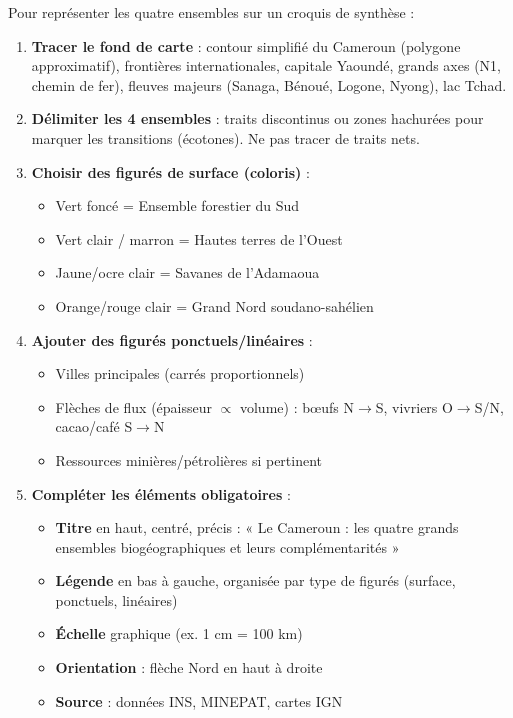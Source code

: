 \documentclass[11pt]{article}
\begin{document}
\begin{methode}
Pour représenter les quatre ensembles sur un croquis de synthèse :
\begin{enumerate}
    \item \textbf{Tracer le fond de carte} : contour simplifié du Cameroun (polygone approximatif), frontières internationales, capitale Yaoundé, grands axes (N1, chemin de fer), fleuves majeurs (Sanaga, Bénoué, Logone, Nyong), lac Tchad.
    \item \textbf{Délimiter les 4 ensembles} : traits discontinus ou zones hachurées pour marquer les transitions (écotones). Ne pas tracer de traits nets.
    \item \textbf{Choisir des figurés de surface (coloris)} : 
    \begin{itemize}
        \item Vert foncé = Ensemble forestier du Sud
        \item Vert clair / marron = Hautes terres de l'Ouest
        \item Jaune/ocre clair = Savanes de l'Adamaoua
        \item Orange/rouge clair = Grand Nord soudano-sahélien
    \end{itemize}
    \item \textbf{Ajouter des figurés ponctuels/linéaires} : 
    \begin{itemize}
        \item Villes principales (carrés proportionnels)
        \item Flèches de flux (épaisseur $\propto$ volume) : bœufs N$\rightarrow$S, vivriers O$\rightarrow$S/N, cacao/café S$\rightarrow$N
        \item Ressources minières/pétrolières si pertinent
    \end{itemize}
    \item \textbf{Compléter les éléments obligatoires} :
    \begin{itemize}
        \item \textbf{Titre} en haut, centré, précis : « Le Cameroun : les quatre grands ensembles biogéographiques et leurs complémentarités »
        \item \textbf{Légende} en bas à gauche, organisée par type de figurés (surface, ponctuels, linéaires)
        \item \textbf{Échelle} graphique (ex. 1 cm = 100 km)
        \item \textbf{Orientation} : flèche Nord en haut à droite
        \item \textbf{Source} : données INS, MINEPAT, cartes IGN
    \end{itemize}
\end{enumerate}
\end{methode}
\end{document}
